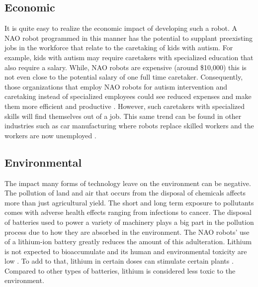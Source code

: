 \subsection{Economic}
It is quite easy to realize the economic impact of developing such a robot. A NAO robot programmed in this manner has the potential to supplant preexisting jobs in the workforce that relate to the caretaking of kids with autism. For example, kids with autism may require caretakers with specialized education that also require a salary. While, NAO robots are expensive (around \$10,000) this is not even close to the potential salary of one full time caretaker. Consequently, those organizations that employ NAO robots for autism intervention and caretaking instead of specialized employees could see reduced expenses and make them more efficient and productive \cite{Acemoglu2020RobotsAJ}. However, such caretakers with specialized skills will find themselves out of a job. This same trend can be found in other industries such as car manufacturing where robots replace skilled workers and the workers are now unemployed \cite{Acemoglu2020RobotsAJ}. \par

\subsection{Environmental}
The impact many forms of technology leave on the environment can be negative. The pollution of land and air that occurs from the disposal of chemicals affects more than just agricultural yield. The short and long term exposure to pollutants comes with adverse health effects ranging from infections to cancer. The disposal of batteries used to power a variety of machinery plays a big part in the pollution process due to how they are absorbed in the environment. The NAO robots’ use of a lithium-ion battery greatly reduces the amount of this adulteration. Lithium is not expected to bioaccumulate and its human and environmental toxicity are low \cite{ARAL2008349}. To add to that, lithium in certain doses can stimulate certain plants \cite{ARAL2008349}. Compared to other types of batteries, lithium is considered less toxic to the environment.\par


